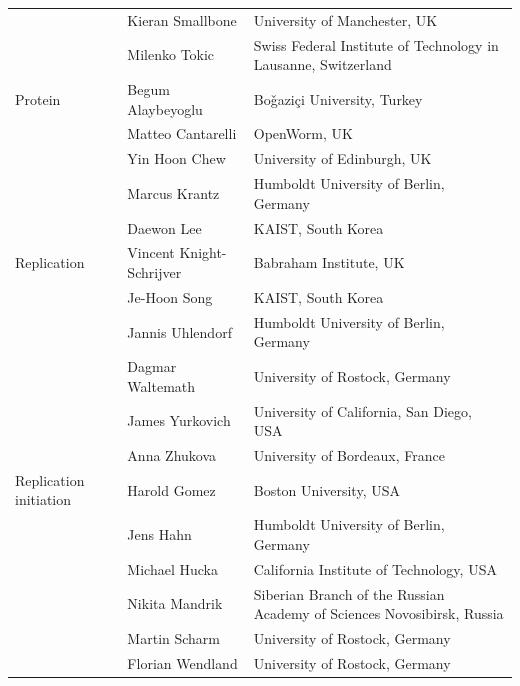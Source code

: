 \documentclass[journal,transmag]{IEEEtran}
\begin{document}
\begin{table}[ht!]
\begin{tabularx}{\textwidth}{l||l||X}
                          & Kieran Smallbone                 & University of Manchester, UK\\
                          & Milenko Tokic                    & Swiss Federal Institute of Technology in Lausanne, Switzerland\\\hline
Protein                   & Begum Alaybeyoglu                & Bo\v{g}azi\c{c}i University, Turkey\\
                          & Matteo Cantarelli                & OpenWorm, UK\\
                          & Yin Hoon Chew                    & University of Edinburgh, UK\\
                          & Marcus Krantz                    & Humboldt University of Berlin, Germany\\
                          & Daewon Lee                       & KAIST, South Korea\\\hline
Replication               & Vincent Knight-Schrijver         & Babraham Institute, UK\\
                          & Je-Hoon Song                     & KAIST, South Korea\\
                          & Jannis Uhlendorf                 & Humboldt University of Berlin, Germany\\
                          & Dagmar Waltemath                 & University of Rostock, Germany\\
                          & James Yurkovich                  & University of California, San Diego, USA\\
                          & Anna Zhukova                     & University of Bordeaux, France\\\hline
Replication initiation    & Harold Gomez                     & Boston University, USA\\
                          & Jens Hahn                        & Humboldt University of Berlin, Germany\\
                          & Michael Hucka                    & California Institute of Technology, USA\\
                          & Nikita Mandrik                   & Siberian Branch of the Russian Academy of Sciences Novosibirsk, Russia\\
                          & Martin Scharm                    & University of Rostock, Germany\\
                          & Florian Wendland                 & University of Rostock, Germany\\\hline

\end{tabularx}
\end{table}
\end{document}
